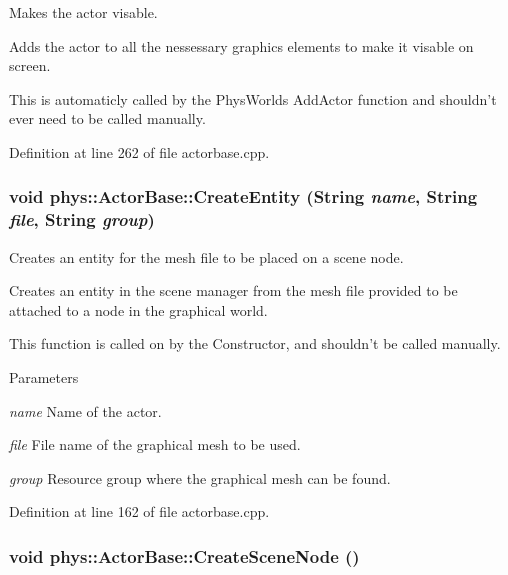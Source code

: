 Makes the actor visable. 

Adds the actor to all the nessessary graphics elements to make it visable on screen. \par
 This is automaticly called by the PhysWorlds AddActor function and shouldn't ever need to be called manually. 

Definition at line 262 of file actorbase.cpp.

\hypertarget{classphys_1_1ActorBase_aff7dbb190fb982a43123bee3066501c4}{
\subsubsection[{CreateEntity}]{\setlength{\rightskip}{0pt plus 5cm}void phys::ActorBase::CreateEntity ({\bf String} {\em name}, \/  {\bf String} {\em file}, \/  {\bf String} {\em group})}}
\label{d8/d0f/classphys_1_1ActorBase_aff7dbb190fb982a43123bee3066501c4}


Creates an entity for the mesh file to be placed on a scene node. 

Creates an entity in the scene manager from the mesh file provided to be attached to a node in the graphical world. \par
 This function is called on by the Constructor, and shouldn't be called manually. 
\begin{DoxyParams}{Parameters}
\item[{\em name}]Name of the actor. \item[{\em file}]File name of the graphical mesh to be used. \item[{\em group}]Resource group where the graphical mesh can be found. \end{DoxyParams}


Definition at line 162 of file actorbase.cpp.

\hypertarget{classphys_1_1ActorBase_a125d6f0a0b4072e64490638c074eea2d}{
\subsubsection[{CreateSceneNode}]{\setlength{\rightskip}{0pt plus 5cm}void phys::ActorBase::CreateSceneNode ()}}
\label{d8/d0f/classphys_1_1ActorBase_a125d6f0a0b4072e64490638c074eea2d}


